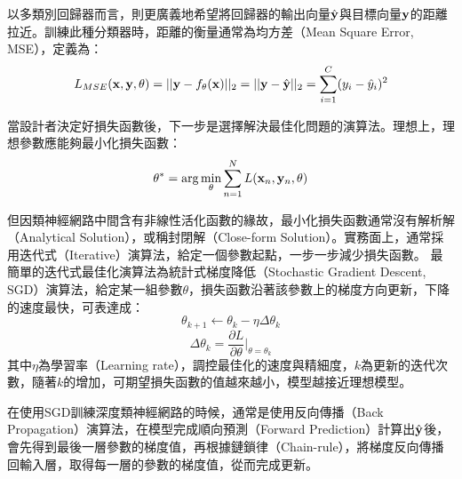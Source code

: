 以多類別回歸器而言，則更廣義地希望將回歸器的輸出向量$\hat{\bold{y}}$與目標向量$\bold{y}$的距離拉近。訓練此種分類器時，距離的衡量通常為均方差（Mean Square Error, MSE），定義為：
\begin{equation}
L_{MSE}(\bold{x} , \bold{y} , \theta) = || \bold{y} - f_{\theta}(\bold{x}) ||_2 = || \bold{y} - \hat{\bold{y}} ||_2 = \sum_{i = 1}^{C} ( y_i - \hat{y}_i )^2 
\end{equation}

當設計者決定好損失函數後，下一步是選擇解決最佳化問題的演算法。理想上，理想參數應能夠最小化損失函數：
\begin{equation}
\theta^* = \arg\min_{\theta}{ \sum_{n=1}^{N}{ {L( \bold{x}_n , \bold{y}_n , \theta)}}}
\end{equation}

但因類神經網路中間含有非線性活化函數的緣故，最小化損失函數通常沒有解析解（Analytical
Solution），或稱封閉解（Close-form Solution）。實務面上，通常採用迭代式（Iterative）演算法，給定一個參數起點，一步一步減少損失函數。
最簡單的迭代式最佳化演算法為統計式梯度降低（Stochastic Gradient Descent, SGD）演算法，給定某一組參數$\theta$，損失函數沿著該參數上的梯度方向更新，下降的速度最快，可表達成：
\begin{equation}
\theta_{k+1} \leftarrow \theta_k - \eta \Delta \theta_{k} 
\end{equation}
\begin{equation}
\Delta \theta_{k} = \frac{\partial L}{\partial \theta} \biggr|_{\theta = \theta_k}
\end{equation}
其中$\eta$為學習率（Learning rate），調控最佳化的速度與精細度，$k$為更新的迭代次數，隨著$k$的增加，可期望損失函數的值越來越小，模型越接近理想模型。


在使用SGD訓練深度類神經網路的時候，通常是使用反向傳播（Back
Propagation）演算法，在模型完成順向預測（Forward
Prediction）計算出$\hat{\bold{y}}$後，會先得到最後一層參數的梯度值，再根據鏈鎖律（Chain-rule），將梯度反向傳播回輸入層，取得每一層的參數的梯度值，從而完成更新。


